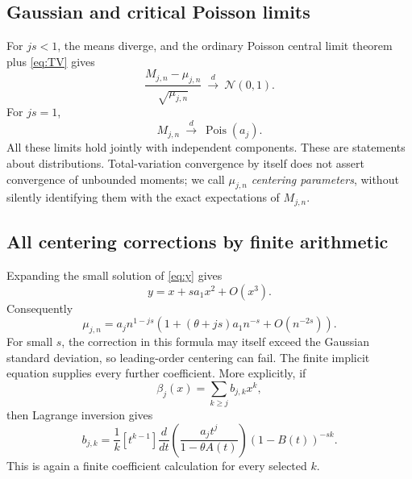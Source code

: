 \documentclass[11pt,a4paper]{article}
\theoremstyle{definition}
\theoremstyle{remark}
\DeclareMathOperator{\Pois}{Pois}
\numberwithin{equation}{section}
\begin{document}
\subsection{Gaussian and critical Poisson limits}
For $js<1$, the means diverge, and the ordinary Poisson central limit
theorem plus \eqref{eq:TV} gives
\begin{equation}
 \frac{M_{j,n}-\mu_{j,n}}{\sqrt{\mu_{j,n}}}
       \ \xrightarrow{\ d\ }\ \mathcal N(0,1).
 \label{eq:CLT}
\end{equation}
For $js=1$,
\begin{equation}
 M_{j,n}\ \xrightarrow{\ d\ }\ \Pois(a_j).
 \label{eq:criticalPoisson}
\end{equation}
All these limits hold jointly with independent components. These are
statements about distributions. Total-variation convergence by itself
does not assert convergence of unbounded moments; we call
$\mu_{j,n}$ \emph{centering parameters}, without silently identifying
them with the exact expectations of $M_{j,n}$.

\subsection{All centering corrections by finite arithmetic}
Expanding the small solution of \eqref{eq:y} gives
\begin{equation}
 y=x+sa_1x^2+O(x^3).
\end{equation}
Consequently
\begin{equation}
 \mu_{j,n}=a_jn^{1-js}
 \left(1+(\theta+js)a_1n^{-s}+O(n^{-2s})\right).
 \label{eq:firstcenter}
\end{equation}
For small $s$, the correction in this formula may itself exceed the
Gaussian standard deviation, so leading-order centering can fail.
The finite implicit equation supplies every further coefficient.
More explicitly, if
\begin{equation}
 \beta_j(x)=\sum_{k\ge j}b_{j,k}x^k,
\end{equation}
then Lagrange inversion gives
\begin{equation}
 b_{j,k}=\frac1k[t^{k-1}]
 \frac{d}{dt}\left(\frac{a_jt^j}{1-\theta A(t)}\right)
            (1-B(t))^{-sk}.
 \label{eq:centeringcoefficients}
\end{equation}
This is again a finite coefficient calculation for every selected $k$.
\end{document}
